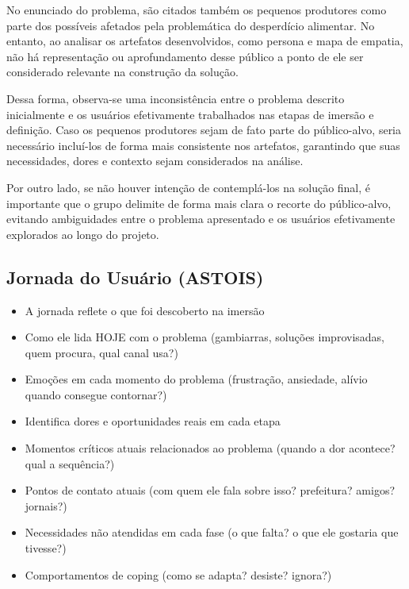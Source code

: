 \documentclass[
  sigconf,
  nonacm, %
  language=portuguese
]{acmart}
\newcommand{\statuswarn}[1]{{\small\bfseries\color{cwarn}#1}}
\begin{document}
No enunciado do problema, são citados também os pequenos produtores como parte dos possíveis afetados pela problemática do desperdício alimentar. No entanto, ao analisar os artefatos desenvolvidos, como persona e mapa de empatia, não há representação ou aprofundamento desse público a ponto de ele ser considerado relevante na construção da solução.

Dessa forma, observa-se uma inconsistência entre o problema descrito inicialmente e os usuários efetivamente trabalhados nas etapas de imersão e definição. Caso os pequenos produtores sejam de fato parte do público-alvo, seria necessário incluí-los de forma mais consistente nos artefatos, garantindo que suas necessidades, dores e contexto sejam considerados na análise.

Por outro lado, se não houver intenção de contemplá-los na solução final, é importante que o grupo delimite de forma mais clara o recorte do público-alvo, evitando ambiguidades entre o problema apresentado e os usuários efetivamente explorados ao longo do projeto.

\subsection{Jornada do Usuário (ASTOIS)}

\noindent\statuswarn{0,33\,/\,0,50 pts · Faltou pouco}

\begin{itemize}[leftmargin=14pt,itemsep=1pt,topsep=3pt,parsep=0pt]
  \item[\textcolor{cgood}{$\checkmark$}] {\small\textcolor{cgood}{A jornada reflete o que foi descoberto na imersão}}
  \item[\textcolor{cgood}{$\checkmark$}] {\small\textcolor{cgood}{Como ele lida HOJE com o problema (gambiarras, soluções improvisadas, quem procura, qual canal usa?)}}
  \item[\textcolor{cgood}{$\checkmark$}] {\small\textcolor{cgood}{Emoções em cada momento do problema (frustração, ansiedade, alívio quando consegue contornar?)}}
  \item[$\square$] {\small\textcolor{cmuted}{Identifica dores e oportunidades reais em cada etapa}}
  \item[\textcolor{cgood}{$\checkmark$}] {\small\textcolor{cgood}{Momentos críticos atuais relacionados ao problema (quando a dor acontece? qual a sequência?)}}
  \item[$\square$] {\small\textcolor{cmuted}{Pontos de contato atuais (com quem ele fala sobre isso? prefeitura? amigos? jornais?)}}
  \item[$\square$] {\small\textcolor{cmuted}{Necessidades não atendidas em cada fase (o que falta? o que ele gostaria que tivesse?)}}
  \item[\textcolor{cgood}{$\checkmark$}] {\small\textcolor{cgood}{Comportamentos de coping (como se adapta? desiste? ignora?)}}
\end{itemize}
\end{document}
